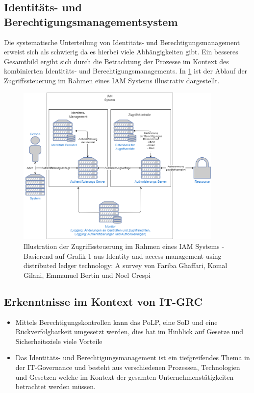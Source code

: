 \documentclass[11pt]{article}
\begin{document}
\subsection{Identitäts- und Berechtigungsmanagementsystem}
Die systematische Unterteilung von Identitäts- und Berechtigungsmanagement erweist sich als schwierig da es hierbei viele Abhängigkeiten gibt. Ein besseres Gesamtbild ergibt sich durch die Betrachtung der Prozesse im Kontext des kombinierten Identitäts- und Berechtigungsmanagements. In \cref{figure:iam} ist der Ablauf der Zugriffssteuerung im Rahmen eines IAM Systems illustrativ dargestellt.
\begin{figure}[H]
  \centering
  \includegraphics[width=0.9\textwidth]{assets/accessmanagement2.png}
  \caption{Illustration der Zugriffssteuerung im Rahmen eines IAM Systems - Basierend auf Grafik 1 aus Identity and access management using distributed ledger technology: A survey von Fariba Ghaffari, Komal Gilani, Emmanuel Bertin und Noel Crespi}\label{figure:iam}
\end{figure}
\subsection{Erkenntnisse im Kontext von IT-GRC}
\begin{itemize}
  \item Mittels Berechtigungskontrollen kann das PoLP, eine SoD und eine Rückverfolgbarkeit umgesetzt werden, dies hat im Hinblick auf Gesetze und Sicherheitsziele viele Vorteile
  \item Das Identitäts- und Berechtigungsmanagement ist ein tiefgreifendes Thema in der IT-Governance und besteht aus verschiedenen Prozessen, Technologien und Gesetzen welche im Kontext der gesamten Unternehmenstätigkeiten betrachtet werden müssen.
\end{itemize}
\end{document}
